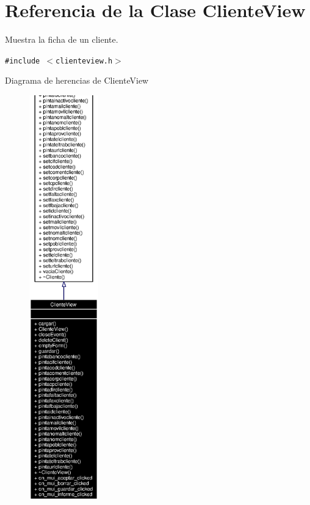 \section{Referencia de la Clase Cliente\-View}
\label{classClienteView}
Muestra la ficha de un cliente.  


{\tt \#include $<$clienteview.h$>$}

Diagrama de herencias de Cliente\-View\begin{figure}[H]
\begin{center}
\leavevmode
\includegraphics[width=85pt]{classClienteView__inherit__graph}
\end{center}
\end{figure}
